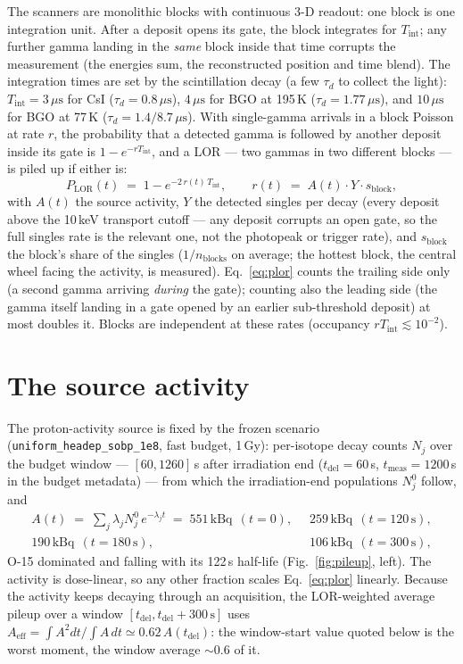 \documentclass[11pt,a4paper]{article}
\newcommand{\us}{\,\mu\mathrm{s}}
\newcommand{\kBq}{\,\mathrm{kBq}}
\newcommand{\Plor}{P_{\mathrm{LOR}}}
\begin{document}
The scanners are monolithic blocks with continuous 3-D readout: one block is one integration
unit. After a deposit opens its gate, the block integrates for $T_{\mathrm{int}}$; any further
gamma landing in the \emph{same} block inside that time corrupts the measurement (the energies
sum, the reconstructed position and time blend). The integration times are set by the
scintillation decay (a few $\tau_d$ to collect the light): $T_{\mathrm{int}} = 3\us$ for CsI
($\tau_d = 0.8\us$), $4\us$ for BGO at 195\,K ($\tau_d = 1.77\us$), and $10\us$ for BGO at
77\,K ($\tau_d = 1.4/8.7\us$).
With single-gamma arrivals in a block Poisson at rate $r$, the probability that a detected gamma
is followed by another deposit inside its gate is $1-e^{-rT_{\mathrm{int}}}$, and a LOR --- two
gammas in two different blocks --- is piled up if either is:
\begin{equation}
\Plor(t) \;=\; 1 - e^{-2\,r(t)\,T_{\mathrm{int}}},
\qquad
r(t) \;=\; A(t)\cdot Y\cdot s_{\mathrm{block}},
\label{eq:plor}
\end{equation}
with $A(t)$ the source activity, $Y$ the detected singles per decay (every deposit above the
10\,keV transport cutoff --- any deposit corrupts an open gate, so the full singles rate is the
relevant one, not the photopeak or trigger rate), and $s_{\mathrm{block}}$ the block's share of
the singles ($1/n_{\mathrm{blocks}}$ on average; the hottest block, the central wheel facing the
activity, is measured). Eq.~\eqref{eq:plor} counts the trailing side only (a second gamma arriving
\emph{during} the gate); counting also the leading side (the gamma itself landing in a gate opened
by an earlier sub-threshold deposit) at most doubles it. Blocks are independent at these rates
(occupancy $rT_{\mathrm{int}} \lesssim 10^{-2}$).

\section{The source activity}
\label{sec:activity}

The proton-activity source is fixed by the frozen scenario (\texttt{uniform\_headep\_sobp\_1e8},
fast budget, 1\,Gy): per-isotope decay counts $N_j$ over the budget window --- $[60,1260]$\,s
after irradiation end ($t_{\mathrm{del}}=60$\,s, $t_{\mathrm{meas}}=1200$\,s in the budget
metadata) --- from which the irradiation-end populations $N_j^0$ follow, and
\begin{align*}
A(t) \;=\; \sum_j \lambda_j N_j^0\, e^{-\lambda_j t}
\;=\; 551\kBq \;\,(t=0),\;\;
&259\kBq \;\,(t=120\,\mathrm{s}),\\[-2pt]
190\kBq \;\,(t=180\,\mathrm{s}),\;\;
&106\kBq \;\,(t=300\,\mathrm{s}),
\end{align*}
O-15 dominated and falling with its 122\,s half-life (Fig.~\ref{fig:pileup}, left). The
activity is dose-linear, so any other fraction scales Eq.~\eqref{eq:plor} linearly. Because the
activity keeps decaying through an acquisition, the LOR-weighted average pileup over a window
$[t_{\mathrm{del}}, t_{\mathrm{del}}+300\,\mathrm{s}]$ uses
$A_{\mathrm{eff}} = \int\! A^2 dt / \!\int\! A\, dt \simeq 0.62\, A(t_{\mathrm{del}})$: the
window-start value quoted below is the worst moment, the window average $\sim$0.6 of it.
\end{document}
